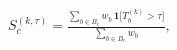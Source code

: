 \documentclass[border=2pt,12pt]{standalone}
\begin{document}
$\displaystyle S_c^{(k,\tau)}=\frac{\sum_{b\in B_c}w_b\,\mathbf{1}\big[T_b^{(k)}>\tau\big]}{\sum_{b\in B_c}w_b},$
\end{document}
